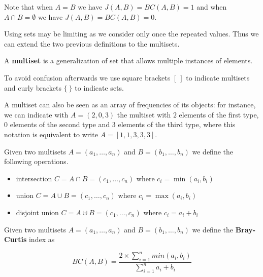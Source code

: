 Note that when $A = B$ we have $J(A, B) = BC(A, B) = 1$ and when $A \cap B = \emptyset$ we have $J (A, B) = BC (A, B) = 0$.

Using sets may be limiting as we consider only once the repeated values. Thus we can extend the two previous definitions to the multisets.\medskip

\begin{definizione}
	A \textbf{multiset} is a generalization of set that allows multiple instances of elements.
\end{definizione}

To avoid confusion afterwards we use square brackets $[\ ]$ to indicate multisets and curly brackets $\{\ \}$ to indicate sets.\medskip

A multiset can also be seen as an array of frequencies of its objects: for instance, we can indicate with $A = (2, 0, 3)$ the multiset with $2$ elements of the first type, $0$ elements of the second type and $3$ elements of the third type, where this notation is equivalent to write $A = [1, 1, 3, 3, 3]$.\medskip

Given two multisets $A = (a_{1}, \ldots, a_{n}) $ and $B = (b_{1}, \ldots, b_{n})$ we define the following operations.

\begin{itemize}
	\item intersection $C = A \cap B  = (c_{1}, \ldots, c_{n})$ where $c_{i} = \min(a_{i}, b_{i})$
	\item union $C = A \cup B  = (c_{1}, \ldots, c_{n})$ where $c_{i} = \max(a_{i}, b_{i})$
	\item disjoint union $C = A \uplus B  = (c_{1}, \ldots, c_{n})$ where $c_{i} = a_{i} + b_{i}$
\end{itemize}

%     


\begin{definizione}\label{def:wbray}
	Given two multisets $A = (a_{1}, \ldots, a_{n}) $ and $B = (b_{1}, \ldots, b_{n})$ we define the \textbf{Bray-Curtis} index as
	
	\begin{equation}
	BC(A,B) = \frac{ 2 \times \sum\limits_{i=1}^n { min(a_{i}, b_{i}) } }{\sum\limits_{i=1}^n {a_{i} + b_{i}}}
	\end{equation}
	
\end{definizione}

